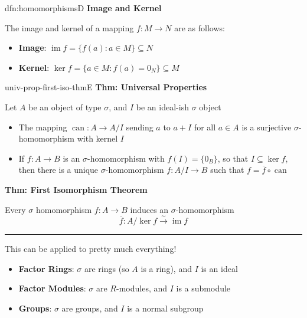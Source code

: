 \documentclass[landscape, 8pt]{extarticle}
\DeclareMathOperator{\im}{im}
\DeclareMathOperator{\can}{can}
\begin{document}
\begin{multicols}{3}
\begin{dfn}{dfn:homomorphisms}{D}
    \textbf{Image and Kernel}

    The image and kernel of a mapping $f : M \to N$ are as follows:
    \vspace{-5pt}

    \begin{itemize}
        \setlength\itemsep{0em}
        \item \textbf{Image}: $\im f = \{f(a) : a\in M\}\subseteq N$
        \item \textbf{Kernel}: $\ker f = \{a\in M : f(a) = 0_{N}\} \subseteq M$
    \end{itemize}


\end{dfn}

\begin{thm}{univ-prop-first-iso-thm}{E}
    \textbf{Thm: Universal Properties}

    Let $A$ be an object of type $\sigma$, and $I$ be an ideal-ish $\sigma$ object
    \vspace{-5pt}
    \begin{itemize}
        \item The mapping $\can : A \to A /I$ sending $a$ to $a + I$ for all $a\in A$ is a surjective $\sigma$-homomorphism with kernel $I$
        \item If $f : A \to B$ is an $\sigma$-homomorphism with $f(I) = \{0_{B}\}$, so that $I\subseteq \ker f$, then there is a unique $\sigma$-homomorphism $f : A / I \to B$ such that $f = \overline{f} \circ \can$
    \end{itemize}
    
    \textbf{Thm: First Isomorphism Theorem}

    Every $\sigma$ homomorphism $f : A \to B$ induces an $\sigma$-homomorphism
    \[\overline{f} : A / \ker f \xrightarrow{\sim} \im f\]

    \vspace{-5pt}
    \noindent\rule{\textwidth}{0.2pt}
    This can be applied to pretty much everything!
    \vspace{-5pt}
    \begin{itemize}[leftmargin=*]
        \setlength\itemsep{0em}
        \item \textbf{Factor Rings}: $\sigma$ are rings (so $A$ is a ring), and $I$ is an ideal
        \item \textbf{Factor Modules}: $\sigma$ are $R$-modules, and $I$ is a submodule
        \item \textbf{Groups}: $\sigma$ are groups, and $I$ is a normal subgroup
    \end{itemize}
\end{thm}


\end{multicols}
\end{document}
